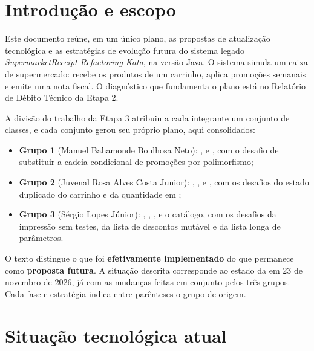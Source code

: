

\tableofcontents\newpage

\section{Introdução e escopo}

Este documento reúne, em um único plano, as propostas de atualização tecnológica e as estratégias de evolução futura do sistema legado \textit{SupermarketReceipt Refactoring Kata}, na versão Java. O sistema simula um caixa de supermercado: recebe os produtos de um carrinho, aplica promoções semanais e emite uma nota fiscal. O diagnóstico que fundamenta o plano está no Relatório de Débito Técnico da Etapa 2.

A divisão do trabalho da Etapa 3 atribuiu a cada integrante um conjunto de classes, e cada conjunto gerou seu próprio plano, aqui consolidados:
\begin{itemize}
\item \textbf{Grupo 1} (Manuel Bahamonde Boulhosa Neto): ,  e , com o desafio de substituir a cadeia condicional de promoções por polimorfismo;
\item \textbf{Grupo 2} (Juvenal Rosa Alves Costa Junior): , ,  e , com os desafios do estado duplicado do carrinho e da quantidade em ;
\item \textbf{Grupo 3} (Sérgio Lopes Júnior): , , ,  e o catálogo, com os desafios da impressão sem testes, da lista de descontos mutável e da lista longa de parâmetros.
\end{itemize}

O texto distingue o que foi \textbf{efetivamente implementado} do que permanece como \textbf{proposta futura}. A situação descrita corresponde ao estado da  em 23 de novembro de 2026, já com as mudanças feitas em conjunto pelos três grupos. Cada fase e estratégia indica entre parênteses o grupo de origem.

\section{Situação tecnológica atual}

